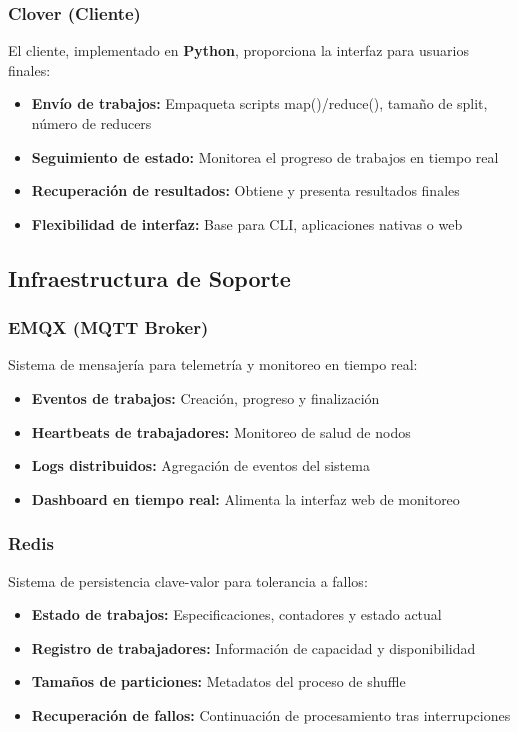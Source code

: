 \subsubsection{Clover (Cliente)}

El cliente, implementado en \textbf{Python}, proporciona la interfaz para usuarios finales:

\begin{itemize}
    \item \textbf{Envío de trabajos:} Empaqueta scripts map()/reduce(), tamaño de split, número de reducers
    \item \textbf{Seguimiento de estado:} Monitorea el progreso de trabajos en tiempo real
    \item \textbf{Recuperación de resultados:} Obtiene y presenta resultados finales
    \item \textbf{Flexibilidad de interfaz:} Base para CLI, aplicaciones nativas o web
\end{itemize}

\subsection{Infraestructura de Soporte}

\subsubsection{EMQX (MQTT Broker)}

Sistema de mensajería para telemetría y monitoreo en tiempo real:

\begin{itemize}
    \item \textbf{Eventos de trabajos:} Creación, progreso y finalización
    \item \textbf{Heartbeats de trabajadores:} Monitoreo de salud de nodos
    \item \textbf{Logs distribuidos:} Agregación de eventos del sistema
    \item \textbf{Dashboard en tiempo real:} Alimenta la interfaz web de monitoreo
\end{itemize}

\subsubsection{Redis}

Sistema de persistencia clave-valor para tolerancia a fallos:

\begin{itemize}
    \item \textbf{Estado de trabajos:} Especificaciones, contadores y estado actual
    \item \textbf{Registro de trabajadores:} Información de capacidad y disponibilidad
    \item \textbf{Tamaños de particiones:} Metadatos del proceso de shuffle
    \item \textbf{Recuperación de fallos:} Continuación de procesamiento tras interrupciones
\end{itemize}

